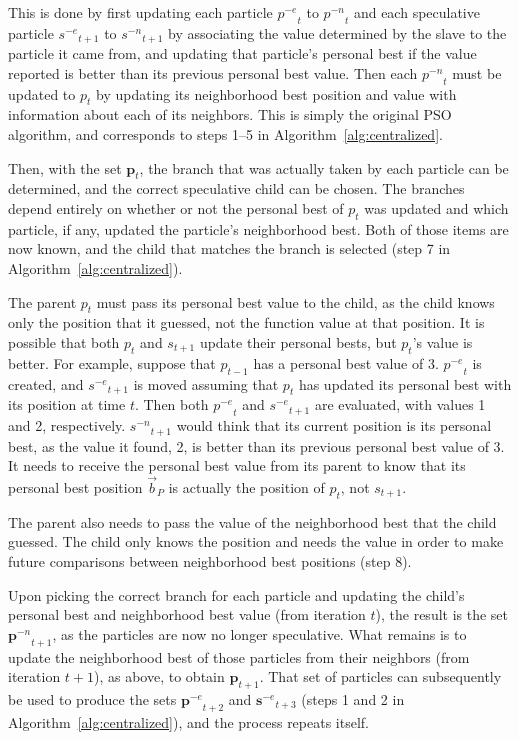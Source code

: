 \documentclass[oneside,honors]{honors}
\newcommand{\alg}[1]{Algorithm~\ref{alg:#1}}
\providecommand{\pbest}{\ensuremath{\Vec{b}_P}}
\providecommand{\noeval}[1]{\ensuremath{#1^{-e}}}
\providecommand{\nonbest}[1]{\ensuremath{#1^{-n}}}
\providecommand{\p}{\ensuremath{p}}
\providecommand{\pset}{\ensuremath{\mathbf{p}}}
\providecommand{\s}{\ensuremath{s}}
\providecommand{\sset}{\ensuremath{\mathbf{s}}}
\begin{document}
This is done by first updating each particle $\noeval{\p}_t$ to
$\nonbest{\p}_t$ and each speculative particle $\noeval{\s}_{t+1}$ to
$\nonbest{\s}_{t+1}$ by associating the value determined by the slave to the
particle it came from, and updating that particle's personal best if the value
reported is better than its previous personal best value.  Then each
$\nonbest{\p}_t$ must be updated to $\p_t$ by updating its neighborhood best
position and value with information about each of its neighbors.  This is
simply the original PSO algorithm, and corresponds to steps 1--5 in
\alg{centralized}.

Then, with the set $\pset_t$, the branch that was actually taken by each
particle can be determined, and the correct speculative child can be chosen.
The branches depend entirely on whether or not the personal best of $p_t$ was
updated and which particle, if any, updated the particle's neighborhood best.
Both of those items are now known, and the child that matches the branch is
selected (step 7 in \alg{centralized}).

The parent $\p_t$ must pass its personal best value to the child, as the child
knows only the position that it guessed, not the function value at that
position.  It is possible that both $\p_t$ and $\s_{t+1}$ update their
personal bests, but $\p_t$'s value is better.  For example, suppose that
$\p_{t-1}$ has a personal best value of 3.  $\noeval{\p}_t$ is created, and
$\noeval{\s}_{t+1}$ is moved assuming that $\p_t$ has updated its personal
best with its position at time $t$.  Then both $\noeval{\p}_t$ and
$\noeval{\s}_{t+1}$ are evaluated, with values 1 and 2, respectively.
$\nonbest{\s}_{t+1}$ would think that its current position is its personal
best, as the value it found, 2, is better than its previous personal best
value of 3.  It needs to receive the personal best value from its parent to
know that its personal best position $\pbest$ is actually the position of
$\p_t$, not $\s_{t+1}$.

The parent also needs to pass the value of the neighborhood best that the child
guessed.  The child only knows the position and needs the value in order to
make future comparisons between neighborhood best positions (step 8).

Upon picking the correct branch for each particle and updating the child's
personal best and neighborhood best value (from iteration $t$), the result is
the set $\nonbest{\pset}_{t+1}$, as the particles are now no longer
speculative.  What remains is to update the neighborhood best of those
particles from their neighbors (from iteration $t+1$), as above, to obtain
$\pset_{t+1}$.  That set of particles can subsequently be used to produce the
sets $\noeval{\pset}_{t+2}$ and $\noeval{\sset}_{t+3}$ (steps 1 and 2 in
\alg{centralized}), and the process repeats itself.
\end{document}
